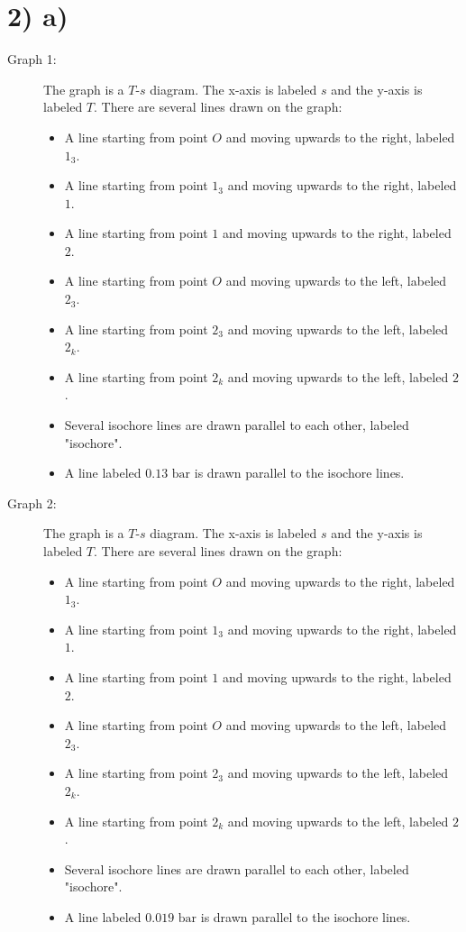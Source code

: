 \section*{2) a)}

\begin{description}
    \item[Graph 1:] The graph is a $T$-$s$ diagram. The x-axis is labeled $s$ and the y-axis is labeled $T$. There are several lines drawn on the graph:
    \begin{itemize}
        \item A line starting from point $O$ and moving upwards to the right, labeled $1_3$.
        \item A line starting from point $1_3$ and moving upwards to the right, labeled $1$.
        \item A line starting from point $1$ and moving upwards to the right, labeled $2$.
        \item A line starting from point $O$ and moving upwards to the left, labeled $2_3$.
        \item A line starting from point $2_3$ and moving upwards to the left, labeled $2_k$.
        \item A line starting from point $2_k$ and moving upwards to the left, labeled $2$.
        \item Several isochore lines are drawn parallel to each other, labeled "isochore".
        \item A line labeled $0.13 \text{ bar}$ is drawn parallel to the isochore lines.
    \end{itemize}
    
    \item[Graph 2:] The graph is a $T$-$s$ diagram. The x-axis is labeled $s$ and the y-axis is labeled $T$. There are several lines drawn on the graph:
    \begin{itemize}
        \item A line starting from point $O$ and moving upwards to the right, labeled $1_3$.
        \item A line starting from point $1_3$ and moving upwards to the right, labeled $1$.
        \item A line starting from point $1$ and moving upwards to the right, labeled $2$.
        \item A line starting from point $O$ and moving upwards to the left, labeled $2_3$.
        \item A line starting from point $2_3$ and moving upwards to the left, labeled $2_k$.
        \item A line starting from point $2_k$ and moving upwards to the left, labeled $2$.
        \item Several isochore lines are drawn parallel to each other, labeled "isochore".
        \item A line labeled $0.019 \text{ bar}$ is drawn parallel to the isochore lines.
    \end{itemize}
\end{description}
